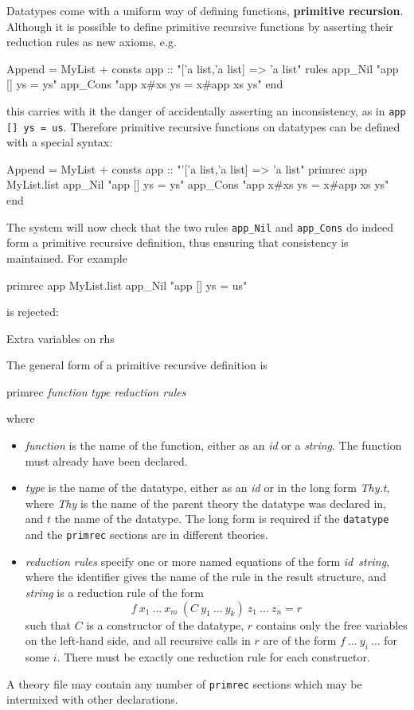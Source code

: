 Datatypes come with a uniform way of defining functions, {\bf primitive
  recursion}. Although it is possible to define primitive recursive functions
by asserting their reduction rules as new axioms, e.g.\
\begin{ttbox}
Append = MyList +
consts app :: "['a list,'a list] => 'a list"
rules 
   app_Nil   "app [] ys = ys"
   app_Cons  "app x#xs ys = x#app xs ys"
end
\end{ttbox}
this carries with it the danger of accidentally asserting an inconsistency,
as in \verb$app [] ys = us$. Therefore primitive recursive functions on
datatypes can be defined with a special syntax:
\begin{ttbox}
Append = MyList +
consts app :: "'['a list,'a list] => 'a list"
primrec app MyList.list
   app_Nil   "app [] ys = ys"
   app_Cons  "app x#xs ys = x#app xs ys"
end
\end{ttbox}
The system will now check that the two rules \verb$app_Nil$ and
\verb$app_Cons$ do indeed form a primitive recursive definition, thus
ensuring that consistency is maintained. For example
\begin{ttbox}
primrec app MyList.list
    app_Nil   "app [] ys = us"
\end{ttbox}
is rejected:
\begin{ttbox}
Extra variables on rhs
\end{ttbox}
\bigskip

The general form of a primitive recursive definition is
\begin{ttbox}
primrec {\it function} {\it type}
    {\it reduction rules}
\end{ttbox}
where
\begin{itemize}
\item {\it function} is the name of the function, either as an {\it id} or a
  {\it string}. The function must already have been declared.
\item {\it type} is the name of the datatype, either as an {\it id} or in the
  long form {\it Thy.t}, where {\it Thy} is the name of the parent theory the
  datatype was declared in, and $t$ the name of the datatype. The long form
  is required if the {\tt datatype} and the {\tt primrec} sections are in
  different theories.
\item {\it reduction rules} specify one or more named equations of the form
  {\it id\/}~{\it string}, where the identifier gives the name of the rule in
  the result structure, and {\it string} is a reduction rule of the form \[
  f~x_1~\dots~x_m~(C~y_1~\dots~y_k)~z_1~\dots~z_n = r \] such that $C$ is a
  constructor of the datatype, $r$ contains only the free variables on the
  left-hand side, and all recursive calls in $r$ are of the form
  $f~\dots~y_i~\dots$ for some $i$. There must be exactly one reduction
  rule for each constructor.
\end{itemize}
A theory file may contain any number of {\tt primrec} sections which may be
intermixed with other declarations.

